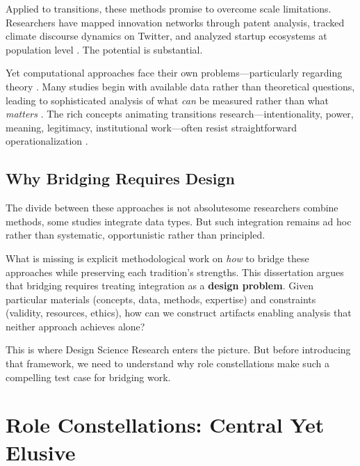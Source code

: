 \documentclass[../main.tex]{subfiles}
\begin{document}
Applied to transitions, these methods promise to overcome scale limitations. Researchers have mapped innovation networks through patent analysis, tracked climate discourse dynamics on Twitter, and analyzed startup ecosystems at population level \cite{jacobides2018ecosystems,phillips2019innovation}. The potential is substantial.

Yet computational approaches face their own problems---particularly regarding theory \cite{ruths2014social,boyd2012critical}. Many studies begin with available data rather than theoretical questions, leading to sophisticated analysis of what \emph{can} be measured rather than what \emph{matters} \cite{tufekci2014big}. The rich concepts animating transitions research---intentionality, power, meaning, legitimacy, institutional work---often resist straightforward operationalization \cite{lawrence2009institutional}.

\subsection{Why Bridging Requires Design}

The divide between these approaches is not absolute\textemdash some researchers combine methods, some studies integrate data types. But such integration remains ad hoc rather than systematic, opportunistic rather than principled.

What is missing is explicit methodological work on \emph{how} to bridge these approaches while preserving each tradition's strengths. This dissertation argues that bridging requires treating integration as a \textbf{design problem}. Given particular materials (concepts, data, methods, expertise) and constraints (validity, resources, ethics), how can we construct artifacts enabling analysis that neither approach achieves alone?

This is where Design Science Research enters the picture. But before introducing that framework, we need to understand why role constellations make such a compelling test case for bridging work.


\section{Role Constellations: Central Yet Elusive}
\label{sec:intro:roles}
\end{document}
